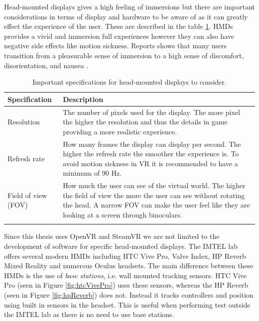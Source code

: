 Head-mounted displays gives a high feeling of immersions but there are important considerations in terms of display and hardware to be aware of as it can greatly effect the experience of the user. These are described in the table \ref{table:hmdSpecs}. HMDs provides a vivid and immersion full experiences however they can also have negative side effects like motion sickness. Reports shows that many users transition from a pleasurable sense of immersion to a high sense of discomfort, disorientation, and nausea \cite{munafo2017virtual}. 

\begin{table}[!ht]
      \centering
      \caption{Important specifications for head-mounted displays to consider.}
        \begin{tabularx}{\textwidth}{l X}
        \toprule
       Specification & Description                                                                           
       \\ 
       \midrule
       \vspace{0.2cm}
        Resolution & The number of pixels used for the display. The more pixel the higher the resolution and thus the details in game providing a more realistic experience.                                   
        \\
        \vspace{0.2cm}
        Refresh rate & How many frames the display can display per second. The higher the refresh rate the smoother the experience is. To avoid motion sickness in VR it is recommended to have a minimum of 90 Hz. 
        \\
        \vspace{0.2cm}
        Field of view (FOV) & How much the user can see of the virtual world. The higher the field of view the more the user can see without rotating the head. A narrow FOV can make the user feel like they are looking at a screen through binoculars.
        \\
        \bottomrule
        \label{table:hmdSpecs}
        \end{tabularx}
\end{table}


Since this thesis uses OpenVR and SteamVR we are not limited to the development of software for specific head-mounted displays. The IMTEL lab offers several modern HMDs including HTC Vive Pro, Valve Index, HP Reverb Mixed Reality and numerous Oculus headsets. The main difference between these HMDs is the use of \textit{base stations}, i.e. wall mounted tracking sensors. HTC Vive Pro (seen in Figure \ref{fig:htcVivePro}) uses these sensors, whereas the HP Reverb (seen in Figure \ref{fig:hpReverb}) does not. Instead it tracks controllers and position using built in sensors in the headset. This is useful when performing test outside the IMTEL lab as there is no need to use base stations.   

